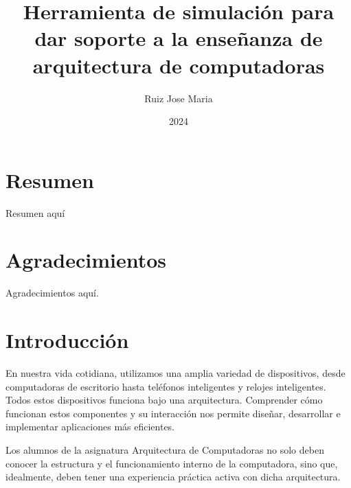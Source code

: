 \documentclass[12pt,twoside]{templates/unerthesis}
\title{Herramienta de simulación para dar soporte a la enseñanza de arquitectura de computadoras}
\author{Ruiz Jose Maria}
\date{2024}
\begin{document}
%


  \maketitle

\frontmatter %
\pagestyle{empty} %



  \setcounter{tocdepth}{1}
  \setlength{\parskip}{0pt}
  \tableofcontents

\setlength\parskip{1em plus 0.1em minus 0.2em}

  \listoftables

  \listoffigures



\mainmatter %
\pagestyle{fancyplain} %

\hypertarget{resumen}{%
\chapter*{Resumen}\label{resumen}}

Resumen aquí

\hypertarget{agradecimientos}{%
\chapter*{Agradecimientos}\label{agradecimientos}}

Agradecimientos aquí.

\hypertarget{introducciuxf3n}{%
\chapter{Introducción}\label{introducciuxf3n}}

En nuestra vida cotidiana, utilizamos una amplia variedad de dispositivos, desde computadoras de escritorio hasta teléfonos inteligentes y relojes inteligentes. Todos estos dispositivos funciona bajo una arquitectura. Comprender cómo funcionan estos componentes y su interacción nos permite diseñar, desarrollar e implementar aplicaciones más eficientes.

Los alumnos de la asignatura Arquitectura de Computadoras no solo deben conocer la estructura y el funcionamiento interno de la computadora, sino que, idealmente, deben tener una experiencia práctica activa con dicha arquitectura.
\end{document}
